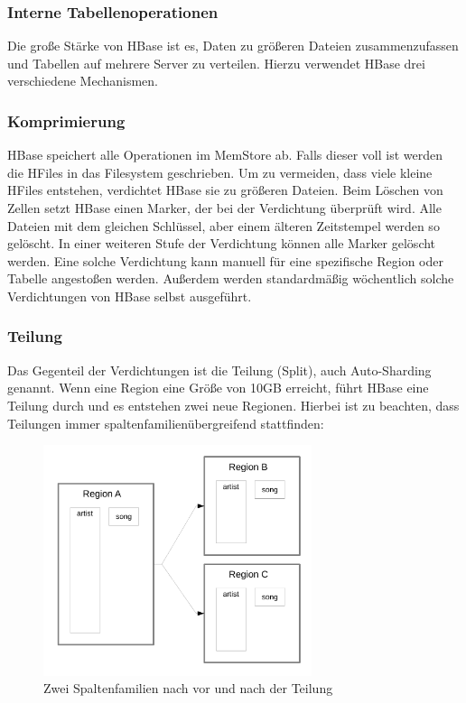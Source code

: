 \subsubsection{Interne Tabellenoperationen}
Die große Stärke von HBase ist es, Daten zu größeren Dateien zusammenzufassen und Tabellen auf mehrere Server zu verteilen. Hierzu verwendet HBase drei verschiedene Mechanismen.

\subsubsection{Komprimierung}\label{komprimierung}
HBase speichert alle Operationen im MemStore ab. Falls dieser voll ist werden die HFiles in das Filesystem geschrieben. Um zu vermeiden, dass viele kleine HFiles entstehen, verdichtet HBase sie zu größeren Dateien. Beim Löschen von Zellen setzt HBase einen Marker, der bei der Verdichtung überprüft wird. Alle Dateien mit dem gleichen Schlüssel, aber einem älteren Zeitstempel werden so gelöscht. In einer weiteren Stufe der Verdichtung können alle Marker gelöscht werden. Eine solche Verdichtung kann manuell für eine spezifische Region oder Tabelle angestoßen werden. Außerdem werden standardmäßig wöchentlich solche Verdichtungen von HBase selbst ausgeführt.

\subsubsection{Teilung}
Das Gegenteil der Verdichtungen ist die Teilung (Split), auch Auto-Sharding genannt. Wenn eine Region eine Größe von 10GB erreicht, führt HBase eine Teilung durch und es entstehen zwei neue Regionen. Hierbei ist zu beachten, dass Teilungen immer spaltenfamilienübergreifend stattfinden:

\begin{figure}[htbp] 
  \centering
     \includegraphics[width=0.7\textwidth]{images/split.pdf}
  \caption{Zwei Spaltenfamilien nach vor und nach der Teilung}
  \label{fig:Teilung}
\end{figure}


